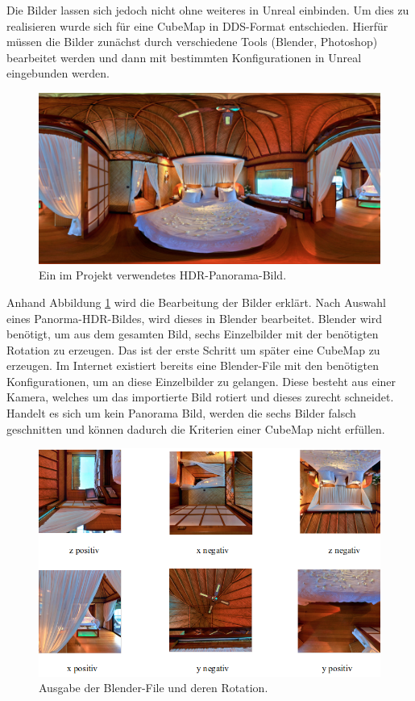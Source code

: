 Die Bilder lassen sich jedoch nicht ohne weiteres in Unreal einbinden. 
Um dies zu realisieren wurde sich f{\"u}r eine CubeMap in DDS-Format entschieden. 
Hierf{\"u}r m{\"u}ssen die Bilder zun{\"a}chst durch verschiedene Tools (Blender, Photoshop) bearbeitet werden und dann mit bestimmten Konfigurationen in Unreal eingebunden werden. \\

\begin{figure}[H] \centering
\includegraphics[width=\textwidth]{Images/hdr-panorama.png} 
\caption{Ein im Projekt verwendetes HDR-Panorama-Bild.}
\label{fig-hdr} 
\end{figure}


Anhand Abbildung \ref{fig-hdr} wird die Bearbeitung der Bilder erkl{\"a}rt. 
Nach Auswahl eines Panorma-HDR-Bildes, wird dieses in Blender bearbeitet. 
Blender wird ben{\"o}tigt, um aus dem gesamten Bild, sechs Einzelbilder mit der ben{\"o}tigten Rotation zu erzeugen. 
Das ist der erste Schritt um sp{\"a}ter eine CubeMap zu erzeugen. 
Im Internet existiert bereits eine Blender-File mit den ben{\"o}tigten Konfigurationen\cite{facerig19}, um an diese Einzelbilder zu gelangen. 
Diese besteht aus einer Kamera, welches um das importierte Bild rotiert und dieses zurecht schneidet. 
Handelt es sich um kein Panorama Bild, werden die sechs Bilder falsch geschnitten und k{\"o}nnen dadurch die Kriterien einer CubeMap nicht erf{\"u}llen. \\

\begin{figure}[H] \centering
\includegraphics[width=\textwidth]{Images/blender-bilder.png} 
\caption{Ausgabe der Blender-File und deren Rotation.}
\label{fig-blender-bilder} 
\end{figure}



